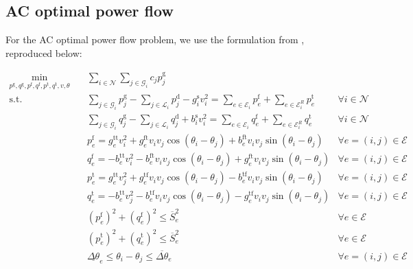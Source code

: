\documentclass{article}
\newcommand{\revise}[1]{{\color{blue} #1}}
\begin{document}
\subsection{AC optimal power flow}

For the AC optimal power flow problem, we use the formulation from \cite{klamkin2025pglearn}, reproduced below:


\begin{align*}
    \min_{p^\mathrm{g}, q^\mathrm{g}, p^\mathrm{f}, q^\mathrm{f}, p^\mathrm{t}, q^\mathrm{t}, v, \theta} \quad & \sum_{i \in \mathcal{N}} \sum_{j \in \mathcal{G}_i} c_j p_j^\mathrm{g} \\
    \text{s.t.} \quad 
    & \sum_{j \in \mathcal{G}_i} p_j^\mathrm{g} - \sum_{j \in \mathcal{L}_i} p_j^\mathrm{d} - g_i^\mathrm{s} v_i^2 = \sum_{e \in \mathcal{E}_i} p^\mathrm{f}_e + \sum_{e \in \mathcal{E}_i^R} p_e^\mathrm{t} & \forall i \in \mathcal{N} \\
    & \sum_{j \in \mathcal{G}_i} q_j^\mathrm{g} - \sum_{j \in \mathcal{L}_i} q_j^\mathrm{d} + b_i^\mathrm{s} v_i^2 = \sum_{e \in \mathcal{E}_i} q^\mathrm{f}_e + \sum_{e \in \mathcal{E}_i^R} q_e^\mathrm{t} & \forall i \in \mathcal{N} \\
    & p_e^\mathrm{f} = g_e^\mathrm{tt} v_i^2 + g_e^\mathrm{ft} v_i v_j \cos(\theta_i - \theta_j) + b_e^\mathrm{ft} v_i v_j \sin(\theta_i - \theta_j) & \forall e = (i,j) \in \mathcal{E} \\
    & q_e^\mathrm{f} = -b_e^\mathrm{tt} v_i^2 - b_e^\mathrm{ft} v_i v_j \cos(\theta_i - \theta_j) + g_e^\mathrm{ft} v_i v_j \sin(\theta_i - \theta_j) & \forall e = (i,j) \in \mathcal{E} \\
    & p_e^\mathrm{t} = g_e^\mathrm{tt} v_j^2 + g_e^\mathrm{tf} v_i v_j \cos(\theta_i - \theta_j) - b_e^\mathrm{tf} v_i v_j \sin(\theta_i - \theta_j) & \forall e = (i,j) \in \mathcal{E} \\
    & q_e^\mathrm{t} = -b_e^\mathrm{tt} v_j^2 - b_e^\mathrm{tf} v_i v_j \cos(\theta_i - \theta_j) - g_e^\mathrm{tf} v_i v_j \sin(\theta_i - \theta_j) & \forall e = (i,j) \in \mathcal{E} \\
    & (p_e^\mathrm{f})^2 + (q_e^\mathrm{f})^2 \leq \overline{S}_e^2 & \forall e \in \mathcal{E} \\
    & (p_e^\mathrm{t})^2 + (q_e^\mathrm{t})^2 \leq \overline{S}_e^2 & \forall e \in \mathcal{E} \\
    & \underline{\Delta \theta}_e \leq \theta_i - \theta_j \leq \overline{\Delta \theta}_e & \forall e = (i,j) \in \mathcal{E} \\

\end{align*}
\end{document}
